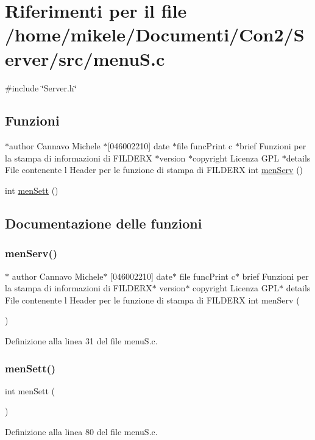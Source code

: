 \hypertarget{a00032}{}\section{Riferimenti per il file /home/mikele/\+Documenti/\+Con2/\+Server/src/menuS.c}
\label{a00032}
{\ttfamily \#include \char`\"{}Server.\+h\char`\"{}}\newline
\subsection*{Funzioni}
\begin{DoxyCompactItemize}
\item 
$\ast$author Cannavo Michele $\ast$\mbox{[}046002210\mbox{]} date $\ast$file func\+Print c $\ast$brief Funzioni per la stampa di informazioni di F\+I\+L\+D\+E\+RX $\ast$version $\ast$copyright Licenza G\+PL $\ast$details File contenente l Header per le funzione di stampa di F\+I\+L\+D\+E\+RX int \mbox{\hyperlink{a00032_a27528a0923c957df8df704580af2bade}{men\+Serv}} ()
\item 
int \mbox{\hyperlink{a00032_abd208224f708f66dffe535a706fb8f98}{men\+Sett}} ()
\end{DoxyCompactItemize}


\subsection{Documentazione delle funzioni}
\mbox{\label{a00032_a27528a0923c957df8df704580af2bade}} 
\subsubsection{\texorpdfstring{menServ()}{menServ()}}
{\footnotesize\ttfamily $\ast$ author Cannavo Michele$\ast$ \mbox{[}046002210\mbox{]} date$\ast$ file func\+Print c$\ast$ brief Funzioni per la stampa di informazioni di F\+I\+L\+D\+E\+RX$\ast$ version$\ast$ copyright Licenza G\+PL$\ast$ details File contenente l Header per le funzione di stampa di F\+I\+L\+D\+E\+RX int men\+Serv (\begin{DoxyParamCaption}{ }\end{DoxyParamCaption})}



Definizione alla linea 31 del file menu\+S.\+c.

\mbox{\label{a00032_abd208224f708f66dffe535a706fb8f98}} 
\subsubsection{\texorpdfstring{menSett()}{menSett()}}
{\footnotesize\ttfamily int men\+Sett (\begin{DoxyParamCaption}{ }\end{DoxyParamCaption})}



Definizione alla linea 80 del file menu\+S.\+c.

